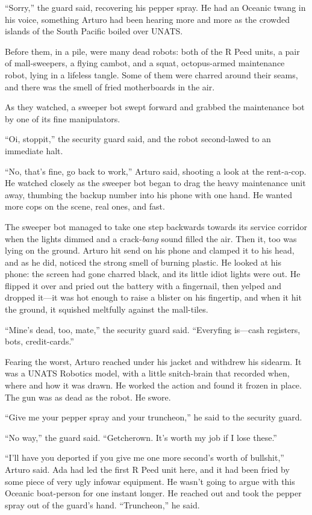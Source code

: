 “Sorry,” the guard said, recovering his pepper spray. He had an
Oceanic twang in his voice, something Arturo had been hearing more
and more as the crowded islands of the South Pacific boiled over
UNATS.

Before them, in a pile, were many dead robots: both of the R Peed
units, a pair of mall-sweepers, a flying cambot, and a squat,
octopus-armed maintenance robot, lying in a lifeless tangle. Some
of them were charred around their seams, and there was the smell of
fried motherboards in the air.

As they watched, a sweeper bot swept forward and grabbed the
maintenance bot by one of its fine manipulators.

“Oi, stoppit,” the security guard said, and the robot second-lawed
to an immediate halt.

“No, that’s fine, go back to work,” Arturo said, shooting a look at
the rent-a-cop. He watched closely as the sweeper bot began to drag
the heavy maintenance unit away, thumbing the backup number into
his phone with one hand. He wanted more cops on the scene, real
ones, and fast.

The sweeper bot managed to take one step backwards towards its
service corridor when the lights dimmed and a crack-\emph{bang}
sound filled the air. Then it, too was lying on the ground. Arturo
hit send on his phone and clamped it to his head, and as he did,
noticed the strong smell of burning plastic. He looked at his
phone: the screen had gone charred black, and its little idiot
lights were out. He flipped it over and pried out the battery with
a fingernail, then yelped and dropped it—it was hot enough to raise
a blister on his fingertip, and when it hit the ground, it squished
meltfully against the mall-tiles.

“Mine’s dead, too, mate,” the security guard said. “Everyfing
is—cash registers, bots, credit-cards.”

Fearing the worst, Arturo reached under his jacket and withdrew his
sidearm. It was a UNATS Robotics model, with a little snitch-brain
that recorded when, where and how it was drawn. He worked the
action and found it frozen in place. The gun was as dead as the
robot. He swore.

“Give me your pepper spray and your truncheon,” he said to the
security guard.

“No way,” the guard said. “Getcherown. It’s worth my job if I lose
these.”

“I’ll have you deported if you give me one more second’s worth of
bullshit,” Arturo said. Ada had led the first R Peed unit here, and
it had been fried by some piece of very ugly infowar equipment. He
wasn’t going to argue with this Oceanic boat-person for one instant
longer. He reached out and took the pepper spray out of the guard’s
hand. “Truncheon,” he said.

